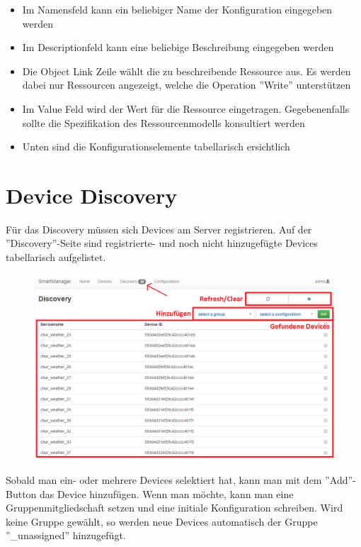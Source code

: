 \begin{itemize}
\item Im Namensfeld kann ein beliebiger Name der Konfiguration eingegeben werden
\item Im Descriptionfeld kann eine beliebige Beschreibung eingegeben werden
\item Die Object Link Zeile wählt die zu beschreibende Ressource aus. Es werden dabei nur Ressourcen angezeigt, welche die Operation ''Write'' unterstützen
\item Im Value Feld wird der Wert für die Ressource eingetragen. Gegebenenfalls sollte die Spezifikation des Ressourcenmodells konsultiert werden
\item Unten sind die Konfigurationselemente tabellarisch ersichtlich
\end{itemize}

\section{Device Discovery}
Für das Discovery müssen sich Devices am Server registrieren. Auf der ''Discovery''-Seite sind registrierte- und noch nicht hinzugefügte Devices tabellarisch aufgelistet.

\begin{figure}[H]
\includegraphics[scale=0.57]{../05_Schlussbericht/images/benutzeranleitung/discovery.png}
\end{figure}  

Sobald man ein- oder mehrere Devices selektiert hat, kann man mit dem ''Add''-Button das Device hinzufügen. Wenn man möchte, kann man eine Gruppenmitgliedschaft setzen und eine initiale Konfiguration schreiben. Wird keine Gruppe gewählt, so werden neue Devices automatisch der Gruppe ''\_unassigned'' hinzugefügt.
\newpage

